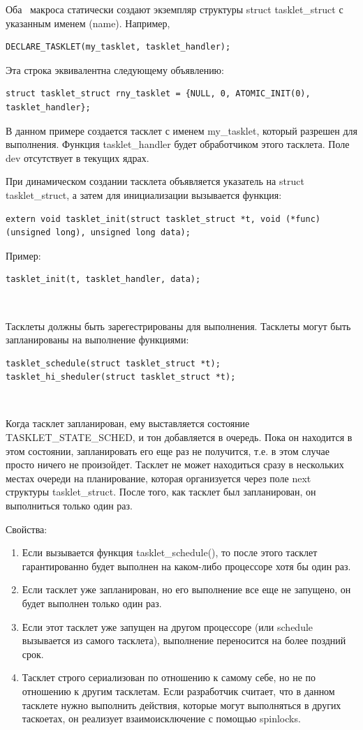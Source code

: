 Оба  макроса статически создают экземпляр структуры struct tasklet\_struct с указанным именем (name). Например,

\begin{lstlisting}
DECLARE_TASKLET(my_tasklet, tasklet_handler);
\end{lstlisting}

Эта строка эквивалентна следующему объявлению:
\begin{lstlisting}
struct tasklet_struct rny_tasklet = {NULL, 0, ATOMIC_INIT(0), tasklet_handler};
\end{lstlisting}

В данном примере создается тасклет с именем my\_tasklet, который разрешен для выполнения. Функция tasklet\_handler будет обработчиком этого тасклета. Поле dev отсутствует в текущих ядрах.

При динамическом создании тасклета объявляется указатель на
struct tasklet\_struct, а затем для инициализации вызывается функция:
\begin{lstlisting}
extern void tasklet_init(struct tasklet_struct *t, void (*func)(unsigned long), unsigned long data);
\end{lstlisting}

Пример:
\begin{lstlisting}
tasklet_init(t, tasklet_handler, data);
\end{lstlisting}   

Тасклеты должны быть зарегестрированы для выполнения. Тасклеты могут быть запланированы на выполнение функциями:
\begin{lstlisting}
tasklet_schedule(struct tasklet_struct *t); 
tasklet_hi_sheduler(struct tasklet_struct *t);
\end{lstlisting}  

Когда тасклет запланирован, ему выставляется состояние TASKLET\_STATE\_SCHED, и тон добавляется в очередь. Пока он находится в этом состоянии, запланировать его еще раз не получится, т.е. в этом случае просто ничего не произойдет. Тасклет не может находиться сразу в нескольких местах очереди на планирование, которая организуется через поле next структуры tasklet\_struct. После того, как тасклет был запланирован, он выполниться только один раз.

Свойства:
\begin{enumerate}
	\item Если вызывается функция tasklet\_schedule(), то после этого тасклет гарантированно будет выполнен на каком-либо процессоре хотя бы один раз. 
	\item Если тасклет уже запланирован, но его выполнение все еще не запущено, он будет выполнен только один раз. 
	\item Если этот тасклет уже запущен на другом процессоре (или schedule вызывается из самого тасклета), выполнение переносится на более поздний срок. 
	\item Тасклет строго сериализован по отношению к самому себе, но не по отношению к другим тасклетам. Если разработчик считает, что в данном тасклете нужно выполнить действия, которые могут выполняться в других таскоетах, он реализует взаимоисключение с помощью spinlocks.
\end{enumerate}


